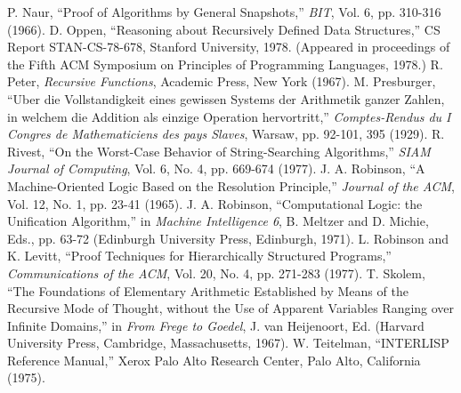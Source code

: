 \documentclass[11pt]{book}
\newcommand{\pubinlineunderline}[1]{\emph{#1}}
\begin{document}
\begin{thebibliography}{99}
 P. Naur, ``Proof of Algorithms by General Snapshots,'' \pubinlineunderline{BIT}, Vol. 6, pp. 310-316 (1966).
 D. Oppen, ``Reasoning about Recursively Defined Data Structures,'' CS Report STAN-CS-78-678, Stanford University, 1978. (Appeared in proceedings  of the Fifth ACM Symposium on Principles of Programming Languages, 1978.) 
 R. Peter, \pubinlineunderline{Recursive Functions}, Academic Press, New York (1967).
 M. Presburger, ``Uber die Vollstandigkeit eines gewissen Systems der Arithmetik ganzer Zahlen, in welchem die Addition als einzige Operation hervortritt,'' \pubinlineunderline{Comptes-Rendus du I Congres de Mathematiciens des pays Slaves}, Warsaw, pp. 92-101, 395 (1929).
 R. Rivest, ``On the Worst-Case Behavior of String-Searching Algorithms,'' \pubinlineunderline{SIAM Journal of Computing}, Vol. 6, No. 4, pp. 669-674 (1977).
 J. A. Robinson, ``A Machine-Oriented Logic Based on the Resolution Principle,'' \pubinlineunderline{Journal of the ACM}, Vol. 12, No. 1, pp. 23-41 (1965).
 J. A. Robinson, ``Computational Logic: the Unification Algorithm,'' in \pubinlineunderline{Machine Intelligence 6},  B. Meltzer and D. Michie, Eds., pp. 63-72 (Edinburgh University Press, Edinburgh, 1971).
 L. Robinson and K. Levitt, ``Proof Techniques for Hierarchically Structured Programs,'' \pubinlineunderline{Communications of the ACM}, Vol. 20, No. 4, pp. 271-283 (1977).
 T. Skolem, ``The Foundations of Elementary Arithmetic Established by Means of the Recursive Mode of Thought, without the Use of Apparent Variables Ranging over Infinite Domains,'' in \pubinlineunderline{From Frege to Goedel},  J. van Heijenoort, Ed. (Harvard University Press, Cambridge, Massachusetts, 1967).
 W. Teitelman, ``INTERLISP Reference Manual,'' Xerox Palo Alto Research Center, Palo Alto, California (1975).
\end{thebibliography}
\end{document}
